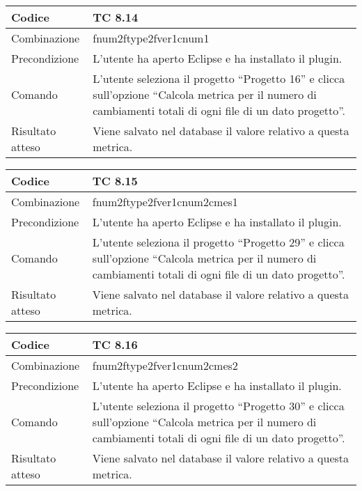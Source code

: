 \begin{table}[ht]
\begin{tabular}{|p{3cm}|p{9cm}|}
\hline
\cellcolor{lightgray}Codice				& TC 8.14								\\
\hline
\cellcolor{lightgray}Combinazione		& fnum2ftype2fver1cnum1									\\
\hline
\cellcolor{lightgray}Precondizione		& L'utente ha aperto Eclipse e ha installato il plugin.		\\
\hline
\cellcolor{lightgray}Comando			& L'utente seleziona il progetto ``Progetto 16''  e clicca sull'opzione ``Calcola metrica per il numero di cambiamenti totali di ogni file di un dato progetto''.	\\
\hline
\cellcolor{lightgray}Risultato atteso	& Viene salvato nel database il valore relativo a questa metrica.\\
\hline
\end{tabular}
\end{table}

\begin{table}[ht]
\begin{tabular}{|p{3cm}|p{9cm}|}
\hline
\cellcolor{lightgray}Codice				& TC 8.15								\\
\hline
\cellcolor{lightgray}Combinazione		& fnum2ftype2fver1cnum2cmes1									\\
\hline
\cellcolor{lightgray}Precondizione		& L'utente ha aperto Eclipse e ha installato il plugin.		\\
\hline
\cellcolor{lightgray}Comando			& L'utente seleziona il progetto ``Progetto 29''  e clicca sull'opzione ``Calcola metrica per il numero di cambiamenti totali di ogni file di un dato progetto''.	\\
\hline
\cellcolor{lightgray}Risultato atteso	& Viene salvato nel database il valore relativo a questa metrica.\\
\hline
\end{tabular}
\end{table}

\begin{table}[ht]
\begin{tabular}{|p{3cm}|p{9cm}|}
\hline
\cellcolor{lightgray}Codice				& TC 8.16								\\
\hline
\cellcolor{lightgray}Combinazione		& fnum2ftype2fver1cnum2cmes2									\\
\hline
\cellcolor{lightgray}Precondizione		& L'utente ha aperto Eclipse e ha installato il plugin.		\\
\hline
\cellcolor{lightgray}Comando			& L'utente seleziona il progetto ``Progetto 30''  e clicca sull'opzione 
``Calcola metrica per il numero di cambiamenti totali di ogni file di un dato progetto''.	\\
\hline
\cellcolor{lightgray}Risultato atteso	& Viene salvato nel database il valore relativo a questa metrica.\\
\hline
\end{tabular}
\end{table}

